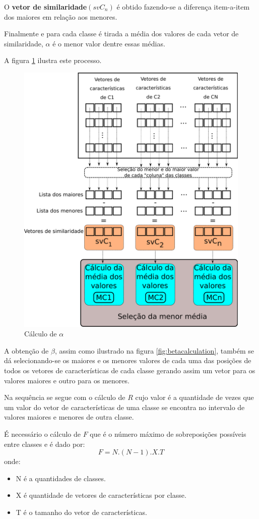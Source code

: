 \documentclass[a4paper,12pt,openright,oneside]{book}
\newenvironment{myenv}[1]
  {\begin{spacing}{#1}}
  {\end{spacing}}
\begin{document}
\begin{myenv}{1.5}
						\par O \textbf{vetor de similaridade}$(svC_n)$ é obtido fazendo-se a diferença item-a-item dos maiores em relação aos menores.
						
						\par Finalmente e para cada classe é tirada a média dos valores de cada vetor de similaridade, $\alpha$ é o menor valor dentre essas médias.
						
						\par A figura \ref{fig:calculoalpha} ilustra este processo.
						
						\begin{figure}[h]
							\centering
							\includegraphics[width=0.6\linewidth]{images/calculoAlpha.pdf}
							\caption{Cálculo de $\alpha$}
							\label{fig:calculoalpha}
						\end{figure}
						
						\par A obtenção de $\beta$, assim como ilustrado na figura \ref{fig:betacalculation}, também se dá selecionando-se os maiores e os menores valores de cada uma das posições de todos os vetores de características de cada classe gerando assim um vetor para os valores maiores e outro para os menores.
						
						\par Na sequência se segue com o cálculo de $R$ cujo valor é a quantidade de vezes que um valor do vetor de características de uma classe se encontra no intervalo de valores maiores e menores de outra classe.
						
						\par É necessário o cálculo de $F$ que é o número máximo de sobreposições possíveis entre classes e é dado por:
						\begin{equation}
								F=N.(N-1).X.T
						\end{equation}
						onde:
						\begin{itemize}
							\item N é a quantidades de classes.
							\item X é quantidade de vetores de características por classe.
							\item T é o tamanho do vetor de características.
						\end{itemize}


\end{myenv}
\end{document}
